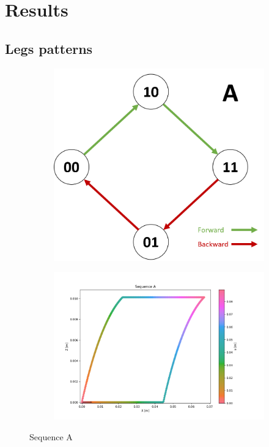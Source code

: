 \chapter{Results}

    \section{Legs patterns}
        \begin{figure}[h]
            \begin{subfigure}{.3\textwidth}
            \includegraphics[width=\textwidth]{images/S_A.png}
            \end{subfigure}%
            \begin{subfigure}{.7\textwidth}
            \includegraphics[width=\textwidth]{images/A.png}
            \end{subfigure}
            \caption{Sequence A}
        \end{figure}
        
